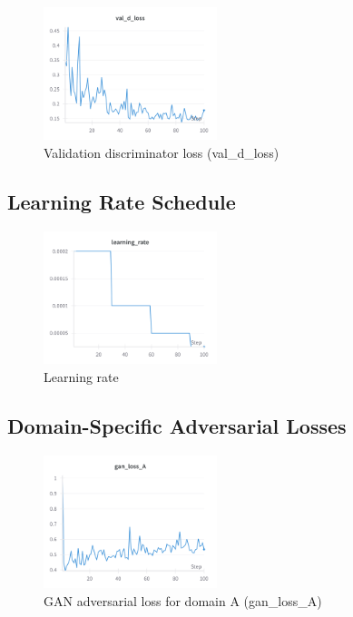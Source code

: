 \documentclass[twocolumn,superscriptaddress,aps]{revtex4-1}
\begin{document}
\begin{figure}[H]
\centering
\includegraphics[width=0.45\textwidth]{assets/val_d_loss.png}
\caption{Validation discriminator loss (val\_d\_loss)}
\label{fig:val_d_loss}
\end{figure}

\subsection{Learning Rate Schedule}

\begin{figure}[H]
\centering
\includegraphics[width=0.45\textwidth]{assets/learning_rate.png}
\caption{Learning rate}
\label{fig:learning_rate}
\end{figure}

\subsection{Domain-Specific Adversarial Losses}

\begin{figure}[H]
\centering
\includegraphics[width=0.45\textwidth]{assets/gan_loss_A.png}
\caption{GAN adversarial loss for domain A (gan\_loss\_A)}
\label{fig:gan_loss_A}
\end{figure}
\end{document}
